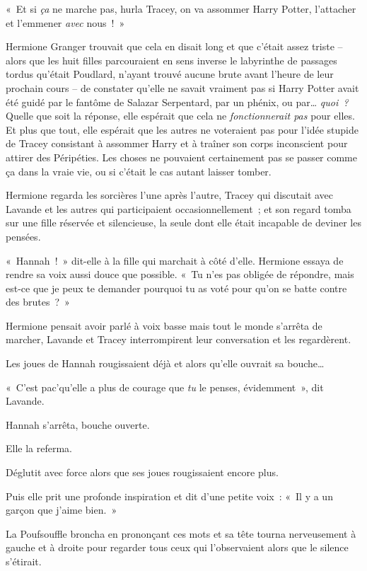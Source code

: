 «~Et si \emph{ça} ne marche pas, hurla Tracey, on va assommer Harry Potter, l'attacher et l'emmener \emph{avec} nous~!~»

\later

Hermione Granger trouvait que cela en disait long et que c'était assez triste -- alors que les huit filles parcouraient en sens inverse le labyrinthe de passages tordus qu'était Poudlard, n'ayant trouvé aucune brute avant l'heure de leur prochain cours -- de constater qu'elle ne savait vraiment pas si Harry Potter avait été guidé par le fantôme de Salazar Serpentard, par un phénix, ou par… \emph{quoi~?} Quelle que soit la réponse, elle espérait que cela ne \emph{fonctionnerait pas} pour elles. Et plus que tout, elle espérait que les autres ne voteraient pas pour l'idée stupide de Tracey consistant à assommer Harry et à traîner son corps inconscient pour attirer des Péripéties. Les choses ne pouvaient certainement pas se passer comme ça dans la vraie vie, ou si c'était le cas autant laisser tomber.

Hermione regarda les sorcières l'une après l'autre, Tracey qui discutait avec Lavande et les autres qui participaient occasionnellement~; et son regard tomba sur une fille réservée et silencieuse, la seule dont elle était incapable de deviner les pensées.

«~Hannah~!~» dit-elle à la fille qui marchait à côté d'elle. Hermione essaya de rendre sa voix aussi douce que possible. «~Tu n'es pas obligée de répondre, mais est-ce que je peux te demander pourquoi tu as voté pour qu'on se batte contre des brutes~?~»

Hermione pensait avoir parlé à voix basse mais tout le monde s'arrêta de marcher, Lavande et Tracey interrompirent leur conversation et les regardèrent.

Les joues de Hannah rougissaient déjà et alors qu'elle ouvrait sa bouche…

«~C'est pac'qu'elle a plus de courage que \emph{tu} le penses, évidemment~», dit Lavande.

Hannah s'arrêta, bouche ouverte.

Elle la referma.

Déglutit avec force alors que ses joues rougissaient encore plus.

Puis elle prit une profonde inspiration et dit d'une petite voix~: «~Il y a un garçon que j'aime bien.~»

La Poufsouffle broncha en prononçant ces mots et sa tête tourna nerveusement à gauche et à droite pour regarder tous ceux qui l'observaient alors que le silence s'étirait.

